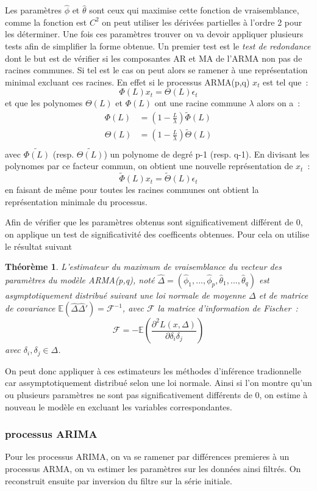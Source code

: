 \documentclass[11pt]{scrartcl} %
\newtheorem{theorem}{Théorème}[section]
\begin{document}
Les paramètres $\hat{\phi}$ et $\hat{\theta}$ sont ceux qui maximise cette fonction de vraisemblance, comme la fonction est $C^2$ on peut utiliser les dérivées partielles à l'ordre 2 pour les déterminer. Une fois ces paramètres trouver on va devoir appliquer plusieurs tests afin de simplifier la forme obtenue. Un premier test est le \textit{test de redondance} dont le but est de vérifier si les composantes AR et MA de l'ARMA non pas de racines communes. Si tel est le cas on peut alors se ramener à une représentation minimal excluant ces racines. En effet si le processus ARMA(p,q) $x_t$ est tel que~:
$$
\Phi(L)x_t=\Theta(L)\epsilon_t
$$
et que les polynomes $\Theta(L)$ et $\Phi(L)$ ont une racine commune $\lambda$ alors on a~:
\begin{align*}
\Phi(L)&=(1-\frac{L}{\lambda})\tilde{\Phi}(L)\\
\Theta(L)&=(1-\frac{L}{\lambda})\tilde{\Theta}(L)\\
\end{align*}
avec $\tilde{\Phi(L)}$ (resp. $\tilde{\Theta(L)}$) un polynome de degré p-1 (resp. q-1). En divisant les polynomes par ce facteur commun, on obtient une nouvelle représentation de $x_t$~:
$$
\tilde{\Phi}(L)x_t=\tilde{\Theta}(L)\epsilon_t
$$
en faisant de même pour toutes les racines communes ont obtient la représentation minimale du processus. 

Afin de vérifier que les paramètres obtenus sont significativement différent de 0, on applique un test de significativité des coefficents obtenues. Pour cela on utilise le résultat suivant 
\begin{theorem}
L'estimateur du maximum de vraisemblance du vecteur des paramètres du modèle ARMA(p,q), noté $\hat{\Delta}=\left(\hat{\phi}_1,...,\hat{\phi}_p,\hat{\theta}_1,...,\hat{\theta}_q\right)$ est asymptotiquement distribué suivant une loi normale de moyenne $\Delta$ et de matrice de covariance $\mathbb{E}\left(\hat{\Delta}\hat{\Delta}'\right)=\mathcal{F}^{-1}$, avec $\mathcal{F}$ la matrice d'information de Fischer~:
$$
\mathcal{F}=-\mathbb{E}\left(\frac{\partial^2L(x,\Delta)}{\partial\delta_i\delta_j}\right)
$$
avec $\delta_i,\delta_j\in \Delta$.
\end{theorem}
On peut donc appliquer à ces estimateurs les méthodes d'inférence tradionnelle car assymptotiquement distribué selon une loi normale. Ainsi si l'on montre qu'un ou plusieurs paramètres ne sont pas significativement différents de 0, on estime à nouveau le modèle en excluant les variables correspondantes.
\subsubsection{processus ARIMA}
Pour les processus ARIMA, on va se ramener par différences premieres à un processus ARMA, on va estimer les paramètres sur les données ainsi filtrés. On reconstruit ensuite par inversion du filtre sur la série initiale.
\end{document}
